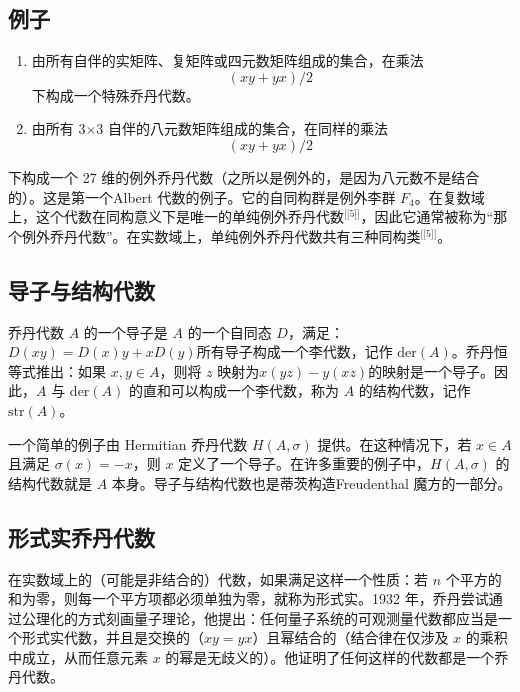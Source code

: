 \subsection{例子}
\begin{enumerate}
\item 由所有自伴的实矩阵、复矩阵或四元数矩阵组成的集合，在乘法
$$
(xy + yx) / 2~
$$
下构成一个特殊乔丹代数。
\item 由所有 3×3 自伴的八元数矩阵组成的集合，在同样的乘法
$$
(xy + yx) / 2~
$$
\end{enumerate}
下构成一个 27 维的例外乔丹代数（之所以是例外的，是因为八元数不是结合的）。这是第一个Albert 代数的例子。它的自同构群是例外李群 $F_4$。在复数域上，这个代数在同构意义下是唯一的单纯例外乔丹代数\(^\text{[[5]]}\)，因此它通常被称为“那个例外乔丹代数”。在实数域上，单纯例外乔丹代数共有三种同构类\(^\text{[[5]]}\)。
\subsection{导子与结构代数}
乔丹代数 $A$ 的一个导子是 $A$ 的一个自同态 $D$，满足：$D(xy) = D(x)y + xD(y)$所有导子构成一个李代数，记作 $\mathrm{der}(A)$。乔丹恒等式推出：如果 $x, y \in A$，则将 $z$ 映射为$x(yz) - y(xz)$的映射是一个导子。因此，$A$ 与 $\mathrm{der}(A)$ 的直和可以构成一个李代数，称为 $A$ 的结构代数，记作 $\mathrm{str}(A)$。

一个简单的例子由 Hermitian 乔丹代数 $H(A, \sigma)$ 提供。在这种情况下，若 $x \in A$ 且满足 $\sigma(x) = -x$，则 $x$ 定义了一个导子。在许多重要的例子中，$H(A, \sigma)$ 的结构代数就是 $A$ 本身。导子与结构代数也是蒂茨构造Freudenthal 魔方的一部分。
\subsection{形式实乔丹代数}
在实数域上的（可能是非结合的）代数，如果满足这样一个性质：若 $n$ 个平方的和为零，则每一个平方项都必须单独为零，就称为形式实。1932 年，乔丹尝试通过公理化的方式刻画量子理论，他提出：任何量子系统的可观测量代数都应当是一个形式实代数，并且是交换的（$xy = yx$）且幂结合的（结合律在仅涉及 $x$ 的乘积中成立，从而任意元素 $x$ 的幂是无歧义的）。他证明了任何这样的代数都是一个乔丹代数。

